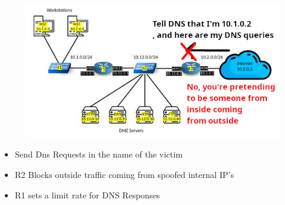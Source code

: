 \documentclass{beamer}
\begin{document}
\begin{frame}
\begin{columns}
\begin{column}{0.5\textwidth}
        \begin{figure}
            \centering
            \includegraphics[width=\textwidth]{dns_defense.jpg}\\
        \end{figure}
            \begin{itemize}[label={}]
                \item \footnotesize Send Dns Requests in the name of the victim
                \item \footnotesize R2 Blocks outside traffic coming from spoofed internal IP's
                \item \footnotesize R1 sets a limit rate for DNS Responses
            \end{itemize}
    \end{column}
\end{columns}
\end{frame}
\end{document}
